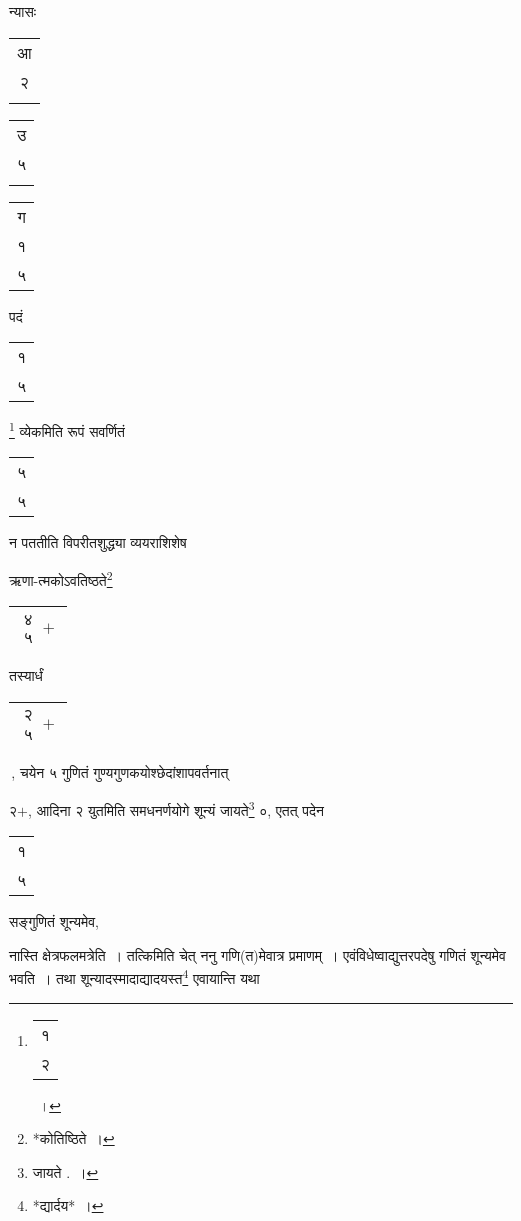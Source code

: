 \documentclass[10pt, openany]{book}
\begin{document}
{न्यासः\textendash \,\hspace{4mm}
\begin{tabular}{|c|}आ \\ २ \\  \\\hline \end{tabular}\begin{tabular}{c|}उ    \\ ५\\ \\\hline \end{tabular}\begin{tabular}{c|}    ग \\ १ \\ ५ \\\hline \end{tabular}

\newpage

{पदं \begin{tabular}{|c|} १ \\ ५\\\hline \end{tabular}\renewcommand{\thefootnote}{१}\footnote{\begin{tabular}{|c|}१ \\२\end{tabular}~।} व्येकमिति रूपं सवर्णितं
\begin{tabular} {|c|}५ \\ ५\\\hline \end{tabular} न पततीति विपरीतशुद्ध्या व्ययराशिशेष}
{ऋणा-त्मकोऽवतिष्ठते\renewcommand{\thefootnote}{२}\footnote{*कोतिष्ठिते~।} \begin{tabular}{|c|} $\begin{matrix}
\mbox{{४}}\\
\mbox{{५}}
\end{matrix}+$\\\hline \end{tabular} तस्यार्धं \begin{tabular}{|c|} $\begin{matrix}
\mbox{{२}}\\
\mbox{{५}}
\end{matrix}+$\\\hline \end{tabular}\,, चयेन ५ गुणितं
गुण्यगुणकयोश्छेदांशापवर्तनात्}
{२$+$, आदिना २ युतमिति समधनर्णयोगे शून्यं जायते\renewcommand{\thefootnote}{३}\footnote{जायते .~।} ०, एतत् पदेन
\begin{tabular}{|c|} १ \\५ \\\hline \end{tabular} सङ्गुणितं शून्यमेव,}
{नास्ति क्षेत्रफलमत्रेति~। तत्किमिति चेत् ननु गणि(त)मेवात्र प्रमाणम्~। 
एवंविधेष्वाद्युत्तरपदेषु}
{गणितं शून्यमेव भवति~। तथा शून्यादस्मादाद्यादयस्त\renewcommand{\thefootnote}{४}\footnote{*द्यार्दय*~।} एवायान्ति यथा\textendash}
\vspace{2mm}

}
\end{document}
